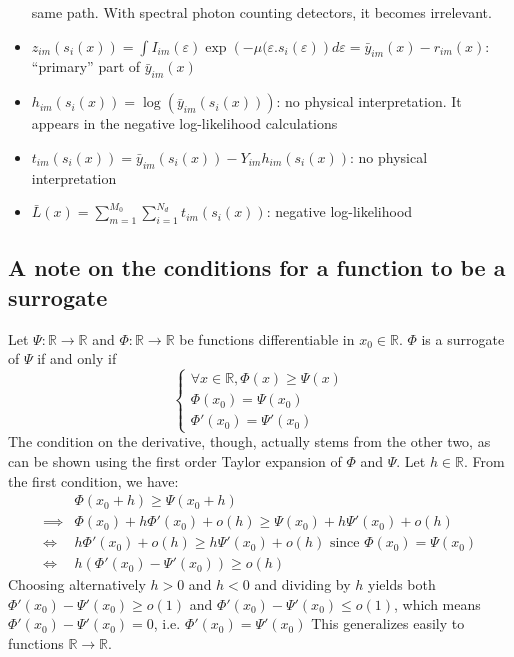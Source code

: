 \documentclass[a4paper, 10pt]{article}
\begin{document}
\begin{itemize}
 same path. With spectral photon counting detectors, it becomes irrelevant.
 \item $z_{im}(s_i(x)) = \int I_{im}(\varepsilon) \exp \left( -\mu(\varepsilon.s_i(\varepsilon)\right) d\varepsilon = \bar{y}_{im}(x) - r_{im}(x)$: ``primary'' part of $\bar{y}_{im}(x)$
 \item $h_{im}(s_i(x)) = \log\left(\bar{y}_{im}(s_i(x))\right) $: no physical interpretation. It appears in the negative log-likelihood calculations
 \item $t_{im}(s_i(x)) = \bar{y}_{im}(s_i(x)) - Y_{im}h_{im}(s_i(x))$: no physical interpretation
 \item $\bar{L}(x) = \sum_{m=1}^{M_0} \sum_{i=1}^{N_d} t_{im}(s_i(x))$: negative log-likelihood 
\end{itemize}

\subsection{A note on the conditions for a function to be a surrogate}

Let $\Psi: \mathbb{R} \to \mathbb{R}$ and $\Phi : \mathbb{R} \to \mathbb{R}$ be functions differentiable in $x_0 \in \mathbb{R}$.
$\Phi$ is a surrogate of $\Psi$ if and only if
\begin{equation}
  \left\{
  \begin{array}{lll}
    \forall x \in \mathbb{R}, \Phi(x) \geq \Psi(x)\\
    \Phi(x_0) = \Psi(x_0) \\
    \Phi'(x_0) = \Psi'(x_0)
  \end{array}
  \right.
\end{equation}
The condition on the derivative, though, actually stems from the other two, as can be shown using the first order Taylor expansion of $\Phi$ and $\Psi$.
Let $h \in \mathbb{R}$. From the first condition, we have:
\begin{equation}
\begin{split}
  & \Phi(x_0 + h) \geq \Psi(x_0 + h) \\
  \implies & \Phi(x_0) + h \Phi'(x_0) + o(h) \geq \Psi(x_0) + h \Psi'(x_0) + o(h) \\
  \iff & h \Phi'(x_0) + o(h) \geq h \Psi'(x_0) + o(h) \text{ since } \Phi(x_0) = \Psi(x_0) \\
  \iff & h \left( \Phi'(x_0) - \Psi'(x_0) \right) \geq o(h)
  \end{split}
\end{equation}
Choosing alternatively $h > 0$ and $h < 0$ and dividing by $h$ yields both $\Phi'(x_0) - \Psi'(x_0) \geq o(1)$ and 
$\Phi'(x_0) - \Psi'(x_0) \leq o(1)$, which means $\Phi'(x_0) - \Psi'(x_0)= 0$, i.e. $\Phi'(x_0) = \Psi'(x_0)$
This generalizes easily to functions $\mathbb{R} \to \mathbb{R}$. 
\end{document}
